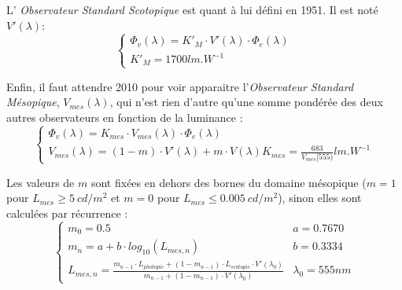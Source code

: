 	
	\par L' \textit{Observateur Standard Scotopique} est quant à lui défini en 1951. Il est noté $V'(\lambda)$:
	\begin{equation}
		\begin{cases}
		\Phi_v(\lambda) = K'_M \cdot V'(\lambda) \cdot \Phi_e(\lambda)\\
		K'_M = 1700 lm.W^{-1}
		\end{cases}
		\label{eq:obs_scotopic}
	\end{equation}
	
	\par Enfin, il faut attendre 2010 pour voir apparaitre l'\textit{Observateur Standard Mésopique}, $V_{mes}(\lambda)$, qui n'est rien d'autre qu'une somme pondérée des deux autres observateurs en fonction de la luminance \citep{halonen_cie_2011}:
	\begin{equation}
		\begin{cases}
		\Phi_v(\lambda) = K_{mes} \cdot V_{mes}(\lambda) \cdot \Phi_e(\lambda)\\
		V_{mes}(\lambda) = (1-m) \cdot V'(\lambda) + m \cdot V(\lambda)
		K_{mes} = \frac{683}{V_{mes}[555)} lm.W^{-1}
		\end{cases}
		\label{eq:obs_mesopic}
	\end{equation}
	
	\par Les valeurs de $m$ sont fixées en dehors des bornes du domaine mésopique ($m = 1$ pour $L_{mes} \geq 5~cd/m^2$ et $m = 0$ pour $L_{mes} \leq 0.005~cd/m^2$), sinon elles sont calculées par récurrence \citep{halonen_cie_2011}:
	\begin{equation}		
	\begin{cases}
		m_0 = 0.5 & a = 0.7670\\
		m_n = a + b \cdot log_{10}(L_{mes,n}) & b = 0.3334\\
		L_{mes,n} = \frac{m_{n-1} \cdot L_{photopic} + (1-m_{n-1}) \cdot L_{scotopic} \cdot V'(\lambda_0)}{m_{n-1} + (1-m_{n-1}) \cdot V'(\lambda_0)} & \lambda_0 = 555 nm
	\end{cases}
	\label{eq:mesopic_param}
	\end{equation}
	
